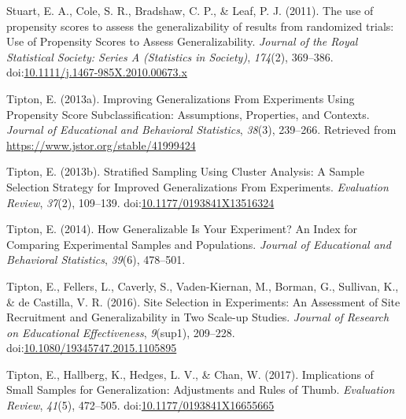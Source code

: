 \documentclass[man,floatsintext]{apa6}
\begin{document}
\leavevmode\hypertarget{ref-stuartUsePropensityScores2011}{}%
Stuart, E. A., Cole, S. R., Bradshaw, C. P., \& Leaf, P. J. (2011). The use of propensity scores to assess the generalizability of results from randomized trials: Use of Propensity Scores to Assess Generalizability. \emph{Journal of the Royal Statistical Society: Series A (Statistics in Society)}, \emph{174}(2), 369--386. doi:\href{https://doi.org/10.1111/j.1467-985X.2010.00673.x}{10.1111/j.1467-985X.2010.00673.x}

\leavevmode\hypertarget{ref-tiptonImprovingGeneralizationsExperiments2013}{}%
Tipton, E. (2013a). Improving Generalizations From Experiments Using Propensity Score Subclassification: Assumptions, Properties, and Contexts. \emph{Journal of Educational and Behavioral Statistics}, \emph{38}(3), 239--266. Retrieved from \url{https://www.jstor.org/stable/41999424}

\leavevmode\hypertarget{ref-tiptonStratifiedSamplingUsing2013}{}%
Tipton, E. (2013b). Stratified Sampling Using Cluster Analysis: A Sample Selection Strategy for Improved Generalizations From Experiments. \emph{Evaluation Review}, \emph{37}(2), 109--139. doi:\href{https://doi.org/10.1177/0193841X13516324}{10.1177/0193841X13516324}

\leavevmode\hypertarget{ref-tiptonHowGeneralizableYour2014}{}%
Tipton, E. (2014). How Generalizable Is Your Experiment? An Index for Comparing Experimental Samples and Populations. \emph{Journal of Educational and Behavioral Statistics}, \emph{39}(6), 478--501.

\leavevmode\hypertarget{ref-tiptonSiteSelectionExperiments2016}{}%
Tipton, E., Fellers, L., Caverly, S., Vaden-Kiernan, M., Borman, G., Sullivan, K., \& de Castilla, V. R. (2016). Site Selection in Experiments: An Assessment of Site Recruitment and Generalizability in Two Scale-up Studies. \emph{Journal of Research on Educational Effectiveness}, \emph{9}(sup1), 209--228. doi:\href{https://doi.org/10.1080/19345747.2015.1105895}{10.1080/19345747.2015.1105895}

\leavevmode\hypertarget{ref-tiptonImplicationsSmallSamples2017}{}%
Tipton, E., Hallberg, K., Hedges, L. V., \& Chan, W. (2017). Implications of Small Samples for Generalization: Adjustments and Rules of Thumb. \emph{Evaluation Review}, \emph{41}(5), 472--505. doi:\href{https://doi.org/10.1177/0193841X16655665}{10.1177/0193841X16655665}

\endgroup
\end{document}
